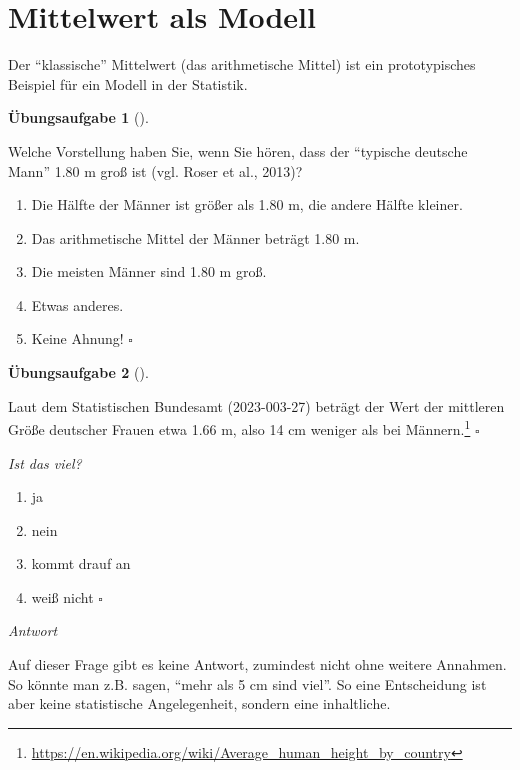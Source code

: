 \documentclass[
  letterpaper,
  twoside,
  open=any]{scrbook}
\providecommand{\tightlist}{%
  \setlength{\itemsep}{0pt}\setlength{\parskip}{0pt}}\usepackage{longtable,booktabs,array}
\theoremstyle{definition}
\theoremstyle{definition}
\newtheorem{exercise}{Übungsaufgabe}[chapter]
\theoremstyle{definition}
\theoremstyle{remark}
\begin{document}
\section{Mittelwert als Modell}\label{sec-mw}

Der \enquote{klassische} Mittelwert (das arithmetische Mittel) ist ein
prototypisches Beispiel für ein Modell in der Statistik.

\begin{exercise}[]\protect\hypertarget{exr-mw-md-mod}{}\label{exr-mw-md-mod}

Welche Vorstellung haben Sie, wenn Sie hören, dass der \enquote{typische
deutsche Mann} 1.80 m groß ist (vgl. Roser et al., 2013)?

\begin{enumerate}
\def\labelenumi{\alph{enumi})}
\tightlist
\item
  Die Hälfte der Männer ist größer als 1.80 m, die andere Hälfte
  kleiner.
\item
  Das arithmetische Mittel der Männer beträgt 1.80 m.
\item
  Die meisten Männer sind 1.80 m groß.
\item
  Etwas anderes.
\item
  Keine Ahnung! \(\square\)
\end{enumerate}

\end{exercise}

\begin{exercise}[]\protect\hypertarget{exr-mw2}{}\label{exr-mw2}

Laut dem Statistischen Bundesamt (2023-003-27) beträgt der Wert der
mittleren Größe deutscher Frauen etwa 1.66 m, also 14 cm weniger als bei
Männern.\footnote{\url{https://en.wikipedia.org/wiki/Average_human_height_by_country}}
\(\square\)

\emph{Ist das viel?}

\begin{enumerate}
\def\labelenumi{\alph{enumi})}
\tightlist
\item
  ja
\item
  nein
\item
  kommt drauf an
\item
  weiß nicht \(\square\)
\end{enumerate}

\emph{Antwort}

Auf dieser Frage gibt es keine Antwort, zumindest nicht ohne weitere
Annahmen. So könnte man z.B. sagen, \enquote{mehr als 5 cm sind viel}.
So eine Entscheidung ist aber keine statistische Angelegenheit, sondern
eine inhaltliche.

\end{exercise}
\end{document}
